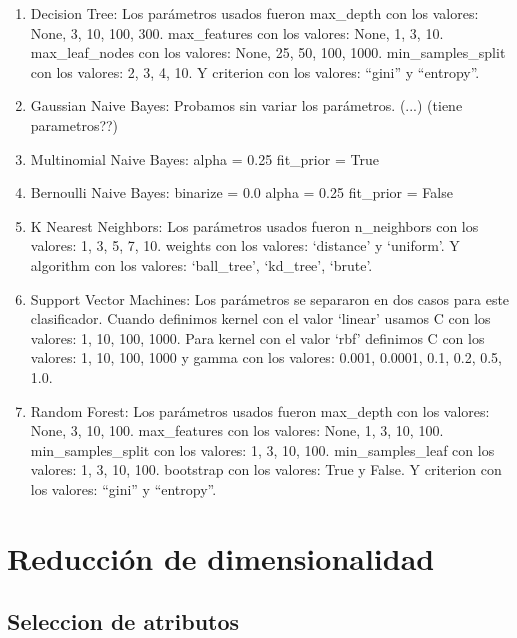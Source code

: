 \documentclass[hidelinks,a4paper,11pt, nofootinbib]{article}
\begin{document}
\begin{enumerate}
 \item Decision Tree: Los parámetros usados fueron max\_depth con los valores: None, 3, 10, 100, 300. max\_features con los valores: None, 1, 3, 10.
 max\_leaf\_nodes con los valores: None, 25, 50, 100, 1000. min\_samples\_split con los valores: 2, 3, 4, 10. Y criterion con los valores: ``gini'' y ``entropy''.

\item Gaussian Naive Bayes: Probamos sin variar los parámetros. (...) (tiene parametros??)

\item Multinomial Naive Bayes: alpha = 0.25 fit\_prior = True

\item Bernoulli Naive Bayes: binarize = 0.0 alpha = 0.25 fit\_prior = False

\item K Nearest Neighbors: Los parámetros usados fueron n\_neighbors con los valores: 1, 3, 5, 7, 10. weights con los valores: \textquoteleft distance' y \textquoteleft uniform'.
Y algorithm con los valores: \textquoteleft ball\_tree', \textquoteleft kd\_tree', \textquoteleft brute'.

\item Support Vector Machines: Los parámetros se separaron en dos casos para este clasificador. Cuando definimos kernel con el valor \textquoteleft linear' usamos C con los valores: 
1, 10, 100, 1000. Para kernel con el valor \textquoteleft rbf' definimos C con los valores: 1, 10, 100, 1000 y gamma con los valores: 0.001, 0.0001, 0.1, 0.2, 0.5, 1.0.

\item Random Forest: Los parámetros usados fueron max\_depth con los valores: None, 3, 10, 100. max\_features con los valores: None, 1, 3, 10, 100. 
min\_samples\_split con los valores: 1, 3, 10, 100. min\_samples\_leaf con los valores: 1, 3, 10, 100. bootstrap con los valores: True y False.
Y criterion con los valores: ``gini'' y ``entropy''.

\end{enumerate}

\section{Reducción de dimensionalidad}

\subsection{Seleccion de atributos}
\end{document}
